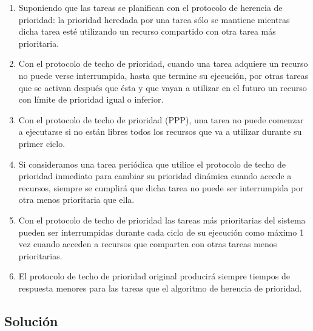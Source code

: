 \documentclass[a4paper,12pt]{article}
\begin{document}
\begin{enumerate}[label=(\alph*)]
    \item Suponiendo que las tareas se planifican con el protocolo de herencia de prioridad: la prioridad heredada por una tarea sólo se mantiene mientras dicha tarea esté utilizando un recurso compartido con otra tarea más prioritaria.
    \item Con el protocolo de techo de prioridad, cuando una tarea adquiere un recurso no puede verse interrumpida, hasta que termine su ejecución, por otras tareas que se activan después que ésta y que vayan a utilizar en el futuro un recurso con límite de prioridad igual o inferior.
    \item Con el protocolo de techo de prioridad (PPP), una tarea no puede comenzar a ejecutarse si no están libres todos los recursos que va a utilizar durante su primer ciclo.
    \item Si consideramos una tarea periódica que utilice el protocolo de techo de prioridad inmediato para cambiar su prioridad dinámica cuando accede a recursos, siempre se cumplirá que dicha tarea no puede ser interrumpida por otra menos prioritaria que ella.
    \item Con el protocolo de techo de prioridad las tareas más prioritarias del sistema pueden ser interrumpidas durante cada ciclo de su ejecución como máximo 1 vez cuando acceden a recursos que comparten con otras tareas menos prioritarias.
    \item El protocolo de techo de prioridad original producirá siempre tiempos de respuesta menores para las tareas que el algoritmo de herencia de prioridad.
\end{enumerate}

\subsection{Solución}
\end{document}
